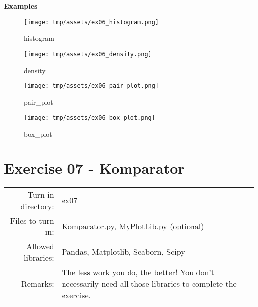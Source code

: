 \documentclass[]{article}
\begin{document}
\textbf{Examples}

\begin{figure}
\centering
\texttt{[image: tmp/assets/ex06\_histogram.png]}
\caption{histogram}
\end{figure}

\begin{figure}
\centering
\texttt{[image: tmp/assets/ex06\_density.png]}
\caption{density}
\end{figure}

\begin{figure}
\centering
\texttt{[image: tmp/assets/ex06\_pair\_plot.png]}
\caption{pair\_plot}
\end{figure}

\begin{figure}
\centering
\texttt{[image: tmp/assets/ex06\_box\_plot.png]}
\caption{box\_plot}
\end{figure}

\clearpage

\hypertarget{exercise-07---komparator-1}{%
\section{Exercise 07 - Komparator}\label{exercise-07---komparator-1}}

\begin{longtable}[]{@{}rl@{}}
\toprule
\endhead
\begin{minipage}[t]{0.54\columnwidth}\raggedleft
Turn-in directory:\strut
\end{minipage} & \begin{minipage}[t]{0.40\columnwidth}\raggedright
ex07\strut
\end{minipage}\tabularnewline
\begin{minipage}[t]{0.54\columnwidth}\raggedleft
Files to turn in:\strut
\end{minipage} & \begin{minipage}[t]{0.40\columnwidth}\raggedright
Komparator.py, MyPlotLib.py (optional)\strut
\end{minipage}\tabularnewline
\begin{minipage}[t]{0.54\columnwidth}\raggedleft
Allowed libraries:\strut
\end{minipage} & \begin{minipage}[t]{0.40\columnwidth}\raggedright
Pandas, Matplotlib, Seaborn, Scipy\strut
\end{minipage}\tabularnewline
\begin{minipage}[t]{0.54\columnwidth}\raggedleft
Remarks:\strut
\end{minipage} & \begin{minipage}[t]{0.40\columnwidth}\raggedright
The less work you do, the better! You don't necessarily need all those
libraries to complete the exercise.\strut
\end{minipage}\tabularnewline
\bottomrule
\end{longtable}
\end{document}
